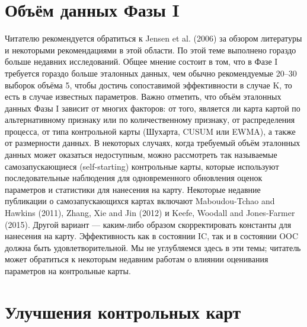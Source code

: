 \section{Объём данных Фазы I}
Читателю рекомендуется обратиться к Jensen et al. (2006) за обзором литературы и некоторыми рекомендациями в этой области. По этой теме выполнено гораздо больше недавних исследований. Общее мнение состоит в том, что в Фазе I требуется гораздо больше эталонных данных, чем обычно рекомендуемые 20--30 выборок объёма 5, чтобы достичь сопоставимой эффективности в случае K, то есть в случае известных параметров. Важно отметить, что объём эталонных данных Фазы I зависит от многих факторов: от того, является ли карта картой по альтернативному признаку или по количественному признаку, от распределения процесса, от типа контрольной карты (Шухарта, CUSUM или EWMA), а также от размерности данных. В некоторых случаях, когда требуемый объём эталонных данных может оказаться недоступным, можно рассмотреть так называемые самозапускающиеся (self-starting) контрольные карты, которые используют последовательные наблюдения для одновременного обновления оценок параметров и статистики для нанесения на карту. Некоторые недавние публикации о самозапускающихся картах включают Maboudou-Tchao and Hawkins (2011), Zhang, Xie and Jin (2012) и Keefe, Woodall and Jones-Farmer (2015). Другой вариант --- каким-либо образом скорректировать константы для нанесения на карту. Эффективность как в состоянии IC, так и в состоянии OOC должна быть удовлетворительной. Мы не углубляемся здесь в эти темы; читатель может обратиться к некоторым недавним работам о влиянии оценивания параметров на контрольные карты.

\section{Улучшения контрольных карт}
